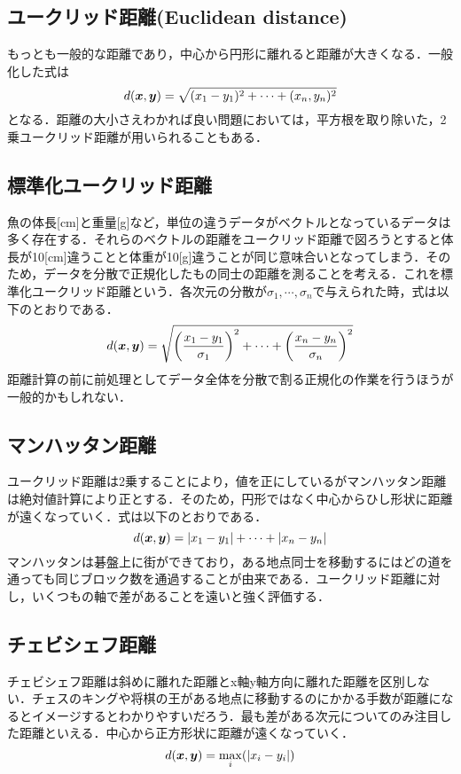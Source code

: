 \documentclass[a4j]{jsarticle}
\def\vec#1{\mbox{\boldmath $#1$}}
\begin{document}
\subsection{ユークリッド距離(Euclidean distance)}
もっとも一般的な距離であり，中心から円形に離れると距離が大きくなる．一般化した式は
\begin{equation}
	d(\vec{x},\vec{y}) = \sqrt{(x_1-y_1)^2+\cdots+(x_n,y_n)^2}
\end{equation}
となる．距離の大小さえわかれば良い問題においては，平方根を取り除いた，2乗ユークリッド距離が用いられることもある．
\subsection{標準化ユークリッド距離}
魚の体長[cm]と重量[g]など，単位の違うデータがベクトルとなっているデータは多く存在する．それらのベクトルの距離をユークリッド距離で図ろうとすると体長が10[cm]違うことと体重が10[g]違うことが同じ意味合いとなってしまう．そのため，データを分散で正規化したもの同士の距離を測ることを考える．これを標準化ユークリッド距離という．各次元の分散が$\sigma_1,\cdots,\sigma_n$で与えられた時，式は以下のとおりである．
\begin{equation}
	d(\vec{x},\vec{y}) = \sqrt{\left(\frac{x_1-y_1}{\sigma_1}\right)^2 + \cdots + \left(\frac{x_n-y_n}{\sigma_n}\right)^2}
\end{equation}
距離計算の前に前処理としてデータ全体を分散で割る正規化の作業を行うほうが一般的かもしれない．
\subsection{マンハッタン距離}
ユークリッド距離は2乗することにより，値を正にしているがマンハッタン距離は絶対値計算により正とする．そのため，円形ではなく中心からひし形状に距離が遠くなっていく．式は以下のとおりである．
\begin{equation}
	d(\vec{x},\vec{y}) = |x_1-y_1| + \cdots + |x_n-y_n|
\end{equation}
マンハッタンは碁盤上に街ができており，ある地点同士を移動するにはどの道を通っても同じブロック数を通過することが由来である．ユークリッド距離に対し，いくつもの軸で差があることを遠いと強く評価する．
\subsection{チェビシェフ距離}
チェビシェフ距離は斜めに離れた距離とx軸y軸方向に離れた距離を区別しない．チェスのキングや将棋の王がある地点に移動するのにかかる手数が距離になるとイメージするとわかりやすいだろう．最も差がある次元についてのみ注目した距離といえる．中心から正方形状に距離が遠くなっていく．
\begin{equation}
	d(\vec{x},\vec{y}) = \max_{i}(|x_i-y_i|)
\end{equation}
\end{document}
